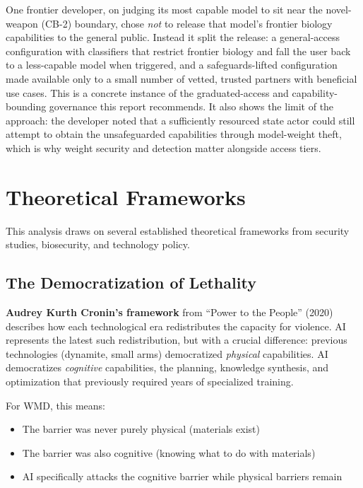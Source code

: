 \documentclass[11pt,letterpaper]{article}
\begin{document}
\begin{contextbox}
One frontier developer, on judging its most capable model to sit near the novel-weapon (CB-2) boundary, chose \textit{not} to release that model's frontier biology capabilities to the general public. Instead it split the release: a general-access configuration with classifiers that restrict frontier biology and fall the user back to a less-capable model when triggered, and a safeguards-lifted configuration made available only to a small number of vetted, trusted partners with beneficial use cases. This is a concrete instance of the graduated-access and capability-bounding governance this report recommends. It also shows the limit of the approach: the developer noted that a sufficiently resourced state actor could still attempt to obtain the unsafeguarded capabilities through model-weight theft, which is why weight security and detection matter alongside access tiers.
\end{contextbox}

\section{Theoretical Frameworks}

This analysis draws on several established theoretical frameworks from security studies, biosecurity, and technology policy.

\subsection{The Democratization of Lethality}

\textbf{Audrey Kurth Cronin's framework} from ``Power to the People'' (2020) describes how each technological era redistributes the capacity for violence. AI represents the latest such redistribution, but with a crucial difference: previous technologies (dynamite, small arms) democratized \textit{physical} capabilities. AI democratizes \textit{cognitive} capabilities, the planning, knowledge synthesis, and optimization that previously required years of specialized training.

For WMD, this means:
\begin{itemize}[nosep]
  \item The barrier was never purely physical (materials exist)
  \item The barrier was also cognitive (knowing what to do with materials)
  \item AI specifically attacks the cognitive barrier while physical barriers remain
\end{itemize}
\end{document}
